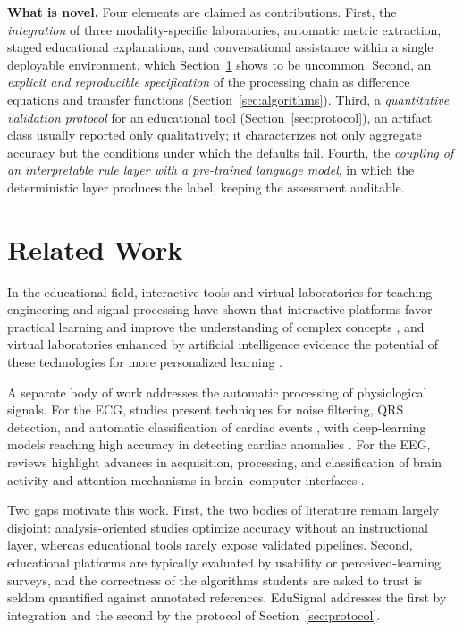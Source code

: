\documentclass[conference]{IEEEtran}
\begin{document}
\textbf{What is novel.} Four elements are claimed as contributions. First, the \emph{integration} of three modality-specific laboratories, automatic metric extraction, staged educational explanations, and conversational assistance within a single deployable environment, which Section~\ref{sec:related} shows to be uncommon. Second, an \emph{explicit and reproducible specification} of the processing chain as difference equations and transfer functions (Section~\ref{sec:algorithms}). Third, a \emph{quantitative validation protocol} for an educational tool (Section~\ref{sec:protocol}), an artifact class usually reported only qualitatively; it characterizes not only aggregate accuracy but the conditions under which the defaults fail. Fourth, the \emph{coupling of an interpretable rule layer with a pre-trained language model}, in which the deterministic layer produces the label, keeping the assessment auditable.

\section{Related Work}
\label{sec:related}

In the educational field, interactive tools and virtual laboratories for teaching engineering and signal processing have shown that interactive platforms favor practical learning and improve the understanding of complex concepts \cite{CHACON202413,DEB202464,ROSAS2022218}, and virtual laboratories enhanced by artificial intelligence evidence the potential of these technologies for more personalized learning \cite{WAHAB2026109490,KUMAR2022100480}.

A separate body of work addresses the automatic processing of physiological signals. For the ECG, studies present techniques for noise filtering, QRS detection, and automatic classification of cardiac events \cite{ANBALAGAN2023100089,LI2022103424}, with deep-learning models reaching high accuracy in detecting cardiac anomalies \cite{HONG2022109213}. For the EEG, reviews highlight advances in acquisition, processing, and classification of brain activity \cite{MISHRA2026110958} and attention mechanisms in brain--computer interfaces \cite{WANG2026103417}.

Two gaps motivate this work. First, the two bodies of literature remain largely disjoint: analysis-oriented studies optimize accuracy without an instructional layer, whereas educational tools rarely expose validated pipelines. Second, educational platforms are typically evaluated by usability or perceived-learning surveys, and the correctness of the algorithms students are asked to trust is seldom quantified against annotated references. EduSignal addresses the first by integration and the second by the protocol of Section~\ref{sec:protocol}.
\end{document}
